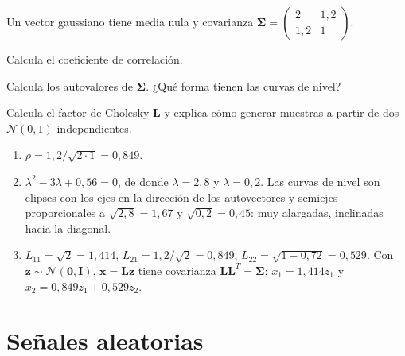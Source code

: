 \documentclass[11pt,a4paper]{scrartcl}
\begin{document}
\begin{ejercicio}
  Un vector gaussiano tiene media nula y covarianza $\boldsymbol\Sigma=\begin{pmatrix}2&1{,}2\\1{,}2&1\end{pmatrix}$.
  \begin{incisos}[1]
    \item Calcula el coeficiente de correlación.
    \item Calcula los autovalores de $\boldsymbol\Sigma$. ¿Qué forma tienen las curvas de nivel?
    \item Calcula el factor de Cholesky $\mathbf L$ y explica cómo generar muestras a partir de dos $\mathcal N(0,1)$ independientes.
  \end{incisos}
\end{ejercicio}
\begin{solucion}
  \begin{enumerate}[label=\alph*)]
    \item $\rho=1{,}2/\sqrt{2\cdot1}=0{,}849$.
    \item $\lambda^2-3\lambda+0{,}56=0$, de donde $\lambda=2{,}8$ y $\lambda=0{,}2$. Las curvas de nivel son elipses con los ejes en la dirección de los autovectores y semiejes proporcionales a $\sqrt{2{,}8}=1{,}67$ y $\sqrt{0{,}2}=0{,}45$: muy alargadas, inclinadas hacia la diagonal.
    \item $L_{11}=\sqrt2=1{,}414$, $L_{21}=1{,}2/\sqrt2=0{,}849$, $L_{22}=\sqrt{1-0{,}72}=0{,}529$. Con $\mathbf z\sim\mathcal N(\mathbf0,\mathbf I)$, $\mathbf x=\mathbf L\mathbf z$ tiene covarianza $\mathbf L\mathbf L^T=\boldsymbol\Sigma$: $x_1=1{,}414z_1$ y $x_2=0{,}849z_1+0{,}529z_2$.
  \end{enumerate}
\end{solucion}

\section*{Señales aleatorias}
\end{document}
